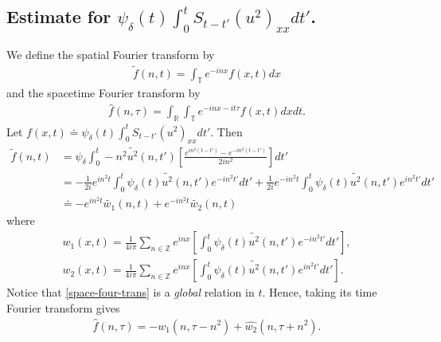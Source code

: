 \documentclass[12pt,reqno]{amsart}
\numberwithin{equation}{section}  %
\newcommand{\rr}{\mathbb{R}}
\newcommand{\zz}{\mathbb{Z}}
\newcommand{\ci}{\mathbb{T}}
\newcommand{\wh}{\widehat}
\newcommand{\wt}{\widetilde}
\begin{document}
\begin{appendices}
\subsection{Estimate for $\psi_{\delta}(t) \int_{0}^{t} S_{t-t'} (u^{2})_{xx} dt'$.}
\label{ssec:non-lin-term}
We define the spatial Fourier transform by 
%
%
\begin{equation*}
\begin{split}
  \tilde{f}(n, t) = \int_{\ci} e^{-inx}f(x,t) dx
\end{split}
\end{equation*}
%
%
and the spacetime Fourier transform by
\begin{equation*}
\begin{split}
  \wh{f}(n, \tau) = \int_{\rr} \int_{\ci} e^{-inx-it\tau}f(x,t) dx dt.
\end{split}
\end{equation*}
%
%
Let $f(x,t) \doteq \psi_{\delta}(t) \int_{0}^{t} S_{t-t'} (u^{2})_{xx} dt'$. 
Then
%
%
\begin{equation}
  \begin{split}
    \wt{f}(n, t)
    & = \psi_{\delta} \int_{0}^{t}-n^{2}\wt{u^{2}}(n, t') \left[
    \frac{e^{in^{2}(t-t')} - e^{-in^{2}(t-t')}}{2 i n^{2}}
    \right] dt'
    \\
    & = - \frac{1}{2i} e^{in^{2}t} \int_{0}^{t} \psi_{\delta}(t) \wt{u^{2}}(n, t')
    e^{-in^{2}t'} dt' + 
    \frac{1}{2i} e^{-in^{2}t} \int_{0}^{t} \psi_{\delta}(t) \wt{u^{2}}(n, t')
    e^{in^{2}t'} dt' \\
    & \doteq - e^{in^{2}t} \wt{w_1}(n, t) + e^{-in^{2}t} \wt{w_2}(n, t)
  \end{split}
  \label{space-four-trans}
\end{equation}
%
where
%
%
\begin{gather*}
  w_{1}(x,t) = \frac{1}{4 i \pi} \sum_{n \in \zz} e^{inx} \left[ \int_{0}^{t}
  \psi_{\delta}(t) \wt{u^{2}}(n, t') e^{-in^{2}t'}
  dt'\right],
  \\
  w_{2}(x,t) = \frac{1}{4 i\pi} \sum_{n \in \zz} e^{inx} \left[ \int_{0}^{t} \psi_{\delta}(t) \wt{u^{2}}(n, t') e^{in^{2}t'} dt'
 \right].
\end{gather*}
%
%
%
Notice that \eqref{space-four-trans} is a \emph{global} relation in $t$.
Hence, taking its time Fourier transform gives
%
%
\begin{equation}
  \label{full-fourier-trans-exp}
\begin{split}
  \wh{f}(n, \tau) = -\wh{w_{1}}(n, \tau - n^{2}) + \wh{w_{2}}(n, \tau +
  n^{2}).
\end{split}

\end{equation}
\end{appendices}
\end{document}
